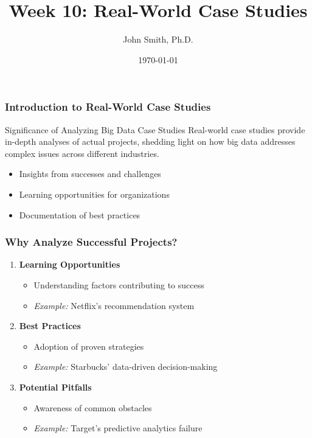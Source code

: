 \documentclass[aspectratio=169]{beamer}
\begin{document}
\frame{\titlepage}

\begin{frame}[fragile]
    \title{Week 10: Real-World Case Studies}
    \author{John Smith, Ph.D.}
    \date{\today}
    \maketitle
\end{frame}

\begin{frame}[fragile]
    \frametitle{Introduction to Real-World Case Studies}
    
    \begin{block}{Significance of Analyzing Big Data Case Studies}
        Real-world case studies provide in-depth analyses of actual projects, shedding light on how big data addresses complex issues across different industries. 
    \end{block}
    
    \begin{itemize}
        \item Insights from successes and challenges
        \item Learning opportunities for organizations
        \item Documentation of best practices
    \end{itemize}
\end{frame}

\begin{frame}[fragile]
    \frametitle{Why Analyze Successful Projects?}
    
    \begin{enumerate}
        \item \textbf{Learning Opportunities}
            \begin{itemize}
                \item Understanding factors contributing to success
                \item \textit{Example:} Netflix's recommendation system
            \end{itemize}
        
        \item \textbf{Best Practices}
            \begin{itemize}
                \item Adoption of proven strategies
                \item \textit{Example:} Starbucks' data-driven decision-making 
            \end{itemize}
        
        \item \textbf{Potential Pitfalls}
            \begin{itemize}
                \item Awareness of common obstacles
                \item \textit{Example:} Target's predictive analytics failure
            \end{itemize}
    \end{enumerate}
\end{frame}
\end{document}
